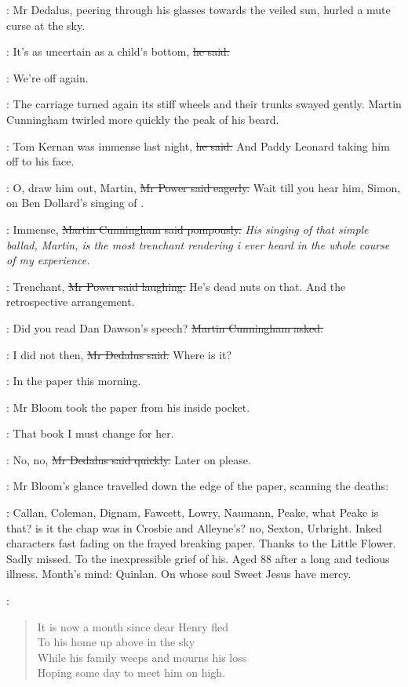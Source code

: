 :
Mr Dedalus, peering through his glasses towards the veiled sun,
hurled a mute curse at the sky.

\simon:
It's as uncertain as a child's bottom,
\sout{he said.}

\cunningham:
We're off again.

:
The carriage turned again its stiff wheels
and their trunks swayed gently.
Martin Cunningham twirled more quickly the peak of his beard.

\cunningham:
Tom Kernan was immense last night,
\sout{he said.}
And Paddy Leonard taking him off to his face.

\power:
O, draw him out, Martin,
\sout{Mr Power said eagerly.}
Wait till you hear him, Simon,
on Ben Dollard's singing of .

\cunningham:
Immense,
\sout{Martin Cunningham said pompously.}
\emph{His singing of that simple ballad, Martin,
is the most trenchant rendering i ever heard in the whole course of my experience.}

\power:
Trenchant,
\sout{Mr Power said laughing.}
He's dead nuts on that.
And the retrospective arrangement.

\cunningham:
Did you read Dan Dawson's speech?
\sout{Martin Cunningham asked.}

\simon:
I did not then,
\sout{Mr Dedalus said.}
Where is it?

\cunningham:
In the paper this morning.

:
Mr Bloom took the paper from his inside pocket.

\BloomInt:
That book I must change for her.

\simon:
No, no,
\sout{Mr Dedalus said quickly.}
Later on please.

:
Mr Bloom's glance travelled down the edge of the paper,
scanning the deaths:

\BloomInt:
Callan, Coleman, Dignam, Fawcett, Lowry, Naumann,
Peake, what Peake is that?
is it the chap was in Crosbie and Alleyne's?
no, Sexton, Urbright.
Inked characters fast fading on the frayed breaking paper.
Thanks to the Little Flower.
Sadly missed.
To the inexpressible grief of his.
Aged 88 after a long and tedious illness.
Month's mind:
Quinlan.
On whose soul Sweet Jesus have mercy.

:
\begin{verse}
    It is now a month since dear Henry fled \\
    To his home up above in the sky \\
    While his family weeps and mourns his loss \\
    Hoping some day to meet him on high.
\end{verse}

